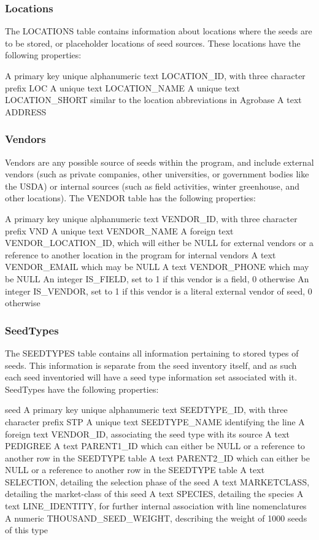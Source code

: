 \documentclass[12pt, letterpaper,oneocolumn]{article}
\begin{document}
		\subsubsection{Locations}
The LOCATIONS table contains information about locations where the seeds are to be stored, or placeholder locations of seed sources. These locations have the following properties: \\
\begin{outline}
	\1 A primary key unique alphanumeric text LOCATION\_ID, with three character prefix LOC
	\1 A unique text LOCATION\_NAME
	\1 A unique text LOCATION\_SHORT similar to the location abbreviations in Agrobase
	\1 A text ADDRESS
\end{outline}
	\subsubsection{Vendors}
Vendors are any possible source of seeds within the program, and include external vendors (such as private companies, other universities, or government bodies like the USDA) or internal sources (such as field activities, winter greenhouse, and other locations). The VENDOR table has the following properties:
\begin{outline}
	\1 A primary key unique alphanumeric text VENDOR\_ID, with three character prefix VND
	\1 A unique text VENDOR\_NAME
	\1 A foreign text VENDOR\_LOCATION\_ID, which will either be NULL for external vendors or a reference to another location in the program for internal vendors
	\1 A text VENDOR\_EMAIL which may be NULL
	\1 A text VENDOR\_PHONE which may be NULL
	\1 An integer IS\_FIELD, set to 1 if this vendor is a field, 0 otherwise
	\1 An integer IS\_VENDOR, set to 1 if this vendor is a literal external vendor of seed, 0 otherwise
\end{outline}
		\subsubsection{SeedTypes}
The SEEDTYPES table contains all information pertaining to stored types of seeds. This information is separate from the seed inventory itself, and as such each seed inventoried will have a seed type information set associated with it. SeedTypes have the following properties: \\
\begin{outline}
seed	\1 A primary key unique alphanumeric text SEEDTYPE\_ID, with three character prefix STP
	\1 A unique text SEEDTYPE\_NAME identifying the line
	\1 A foreign text VENDOR\_ID, associating the seed type with its source
	\1 A text PEDIGREE
	\1 A text PARENT1\_ID which can either be NULL or a reference to another row in the SEEDTYPE table
	\1 A text PARENT2\_ID which can either be NULL or a reference to another row in the SEEDTYPE table
	\1 A text SELECTION, detailing the selection phase of the seed
	\1 A text MARKETCLASS, detailing the market-class of this seed
	\1 A text SPECIES, detailing the species
	\1 A text LINE\_IDENTITY, for further internal association with line nomenclatures
	\1 A numeric THOUSAND\_SEED\_WEIGHT, describing the weight of 1000 seeds of this type
\end{outline}
\end{document}
